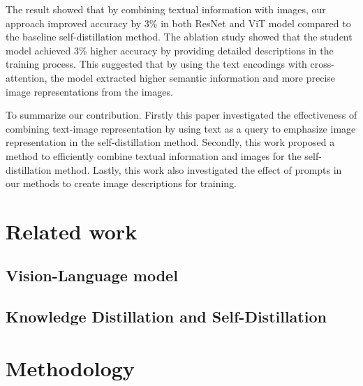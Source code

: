 \documentclass[10pt,twocolumn,letterpaper]{article}
\begin{document}
The result showed that by combining textual information with images, our approach improved accuracy by 3\% in both ResNet \cite{he2016deep} and ViT \cite{dosovitskiy2021an} model compared to the baseline self-distillation method.
The ablation study showed that the student model achieved 3\% higher accuracy by providing detailed descriptions in the training process.
This suggested that by using the text encodings with cross-attention, the model extracted higher semantic information and more precise image representations from the images.

To summarize our contribution.
Firstly this paper investigated the effectiveness of combining text-image representation by using text as a query to emphasize image representation in the self-distillation method.
Secondly, this work proposed a method to efficiently combine textual information and images for the self-distillation method.
Lastly, this work also investigated the effect of prompts in our methods to create image descriptions for training.

\section{Related work}

\subsection{Vision-Language model}

\subsection{Knowledge Distillation and Self-Distillation}

\section{Methodology}

{\small


}
\end{document}
